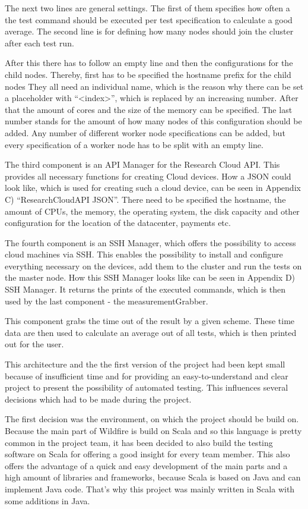 The next two lines are general settings. The first of them specifies how often a the test command should be executed per test specification to calculate a good average. The second line is for defining how many nodes should join the cluster after each test run.

After this there has to follow an empty line and then the configurations for the child nodes. Thereby, first has to be specified the hostname prefix for the child nodes They all need an individual name, which is the reason why there can be set a placeholder with ``<index>'', which is replaced by an increasing number. After that the amount of cores and the size of the memory can be specified. The last number stands for the amount of how many nodes of this configuration should be added. Any number of different worker node specifications can be added, but every specification of a worker node has to be split with an empty line.

The third component is an API Manager for the Research Cloud API. This provides all necessary functions for creating Cloud devices. How a JSON could look like, which is used for creating such a cloud device, can be seen in Appendix C) ``ResearchCloudAPI JSON''. There need to be specified the hostname, the amount of CPUs, the memory, the operating system, the disk capacity and other configuration for the location of the datacenter, payments etc.

The fourth component is an SSH Manager, which offers the possibility to access cloud machines via SSH. This enables the possibility to install and configure everything necessary on the devices, add them to the cluster and run the tests on the master node. How this SSH Manager looks like can be seen in Appendix D) SSH Manager. It returns the prints of the executed commands, which is then used by the last component - the measurementGrabber.

This component grabs the time out of the result by a given scheme. These time data are then used to calculate an average out of all tests, which is then printed out for the user.

This architecture and the the first version of the project had been kept small because of insufficient time and for providing an easy-to-understand and clear project to present the possibility of automated testing. This influences several decisions which had to be made during the project.

The first decision was the environment, on which the project should be build on. Because the main part of Wildfire is build on Scala and so this language is pretty common in the project team, it has been decided to also build the testing software on Scala for offering a good insight for every team member. This also offers the advantage of a quick and easy development of the main parts and a high amount of libraries and frameworks, because Scala is based on Java and can implement Java code. That's why this project was mainly written in Scala with some additions in Java.

